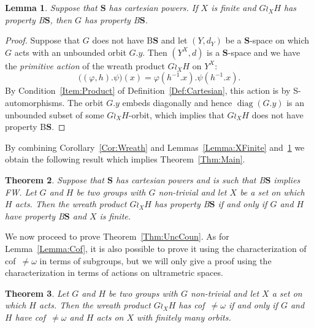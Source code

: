 \documentclass[a4paper]{article}
\newtheorem{lem}{Lemma}[section]
\newtheorem{thm}[lem]{Theorem}
\theoremstyle{definition}
\DeclareMathOperator\diag{diag}
\newcommand*{\BS}{B$\mathbf{S}$}
\begin{document}
%
%
\begin{lem}\label{Lemma:Unboundedness}
Suppose that $\mathbf{S}$ has cartesian powers. If $X$ is finite and $G\wr_XH$ has property \BS, then $G$ has property \BS.
\end{lem}
\begin{proof}
Suppose that $G$ does not have \BS{} and let $(Y,d_Y)$ be a $\mathbf S$-space on which $G$ acts with an unbounded orbit $G.y$.
Then $(Y^X,d)$ is a $\mathbf S$-space and we have the \emph{primitive action} of the wreath product $G\wr_XH$ on $Y^X$:
\[
	\bigl((\varphi,h).\psi\bigr)(x)=\varphi(h^{-1}.x).\psi(h^{-1}.x).
\]
By Condition~\ref{Item:Product} of Definition~\ref{Def:Cartesian}, this action is by S-automorphisms.
The orbit $G.y$ embeds diagonally and hence $\diag(G.y)$ is an unbounded subset of some $G\wr_XH$-orbit, which implies that $G\wr_XH$ does not have property \BS.
\end{proof}
%
%
By combining Corollary~\ref{Cor:Wreath} and Lemmas~\ref{Lemma:XFinite} and~\ref{Lemma:Unboundedness} we obtain the following result which implies Theorem~\ref{Thm:Main}.
%
%
\begin{thm}\label{Thm:Technic}
Suppose that $\mathbf{S}$ has cartesian powers and is such that \BS{} implies FW.
Let $G$ and $H$ be two groups with $G$ non-trivial and let $X$ be a set on which $H$ acts. Then the wreath product $G \wr_X H$ has property \BS{} if and only if $G$ and $H$ have property \BS{} and $X$ is finite.
\end{thm}
%
%
We now proceed to prove Theorem~\ref{Thm:UncCoun}.
As for Lemma~\ref{Lemma:Cof}, it is also possible to prove it using the characterization of cof~$\neq\omega$ in terms of subgroups, but we will only give a proof using the characterization in terms of actions on ultrametric spaces.
%
%
\begin{thm}
Let $G$ and $H$ be two groups with $G$ non-trivial and let $X$ a set on which $H$ acts. Then the wreath product $G \wr_X H$ has cof~$\neq\omega$ if and only if $G$ and $H$ have cof~$\neq\omega$ and $H$ acts on $X$ with finitely many orbits.
\end{thm}
\end{document}
